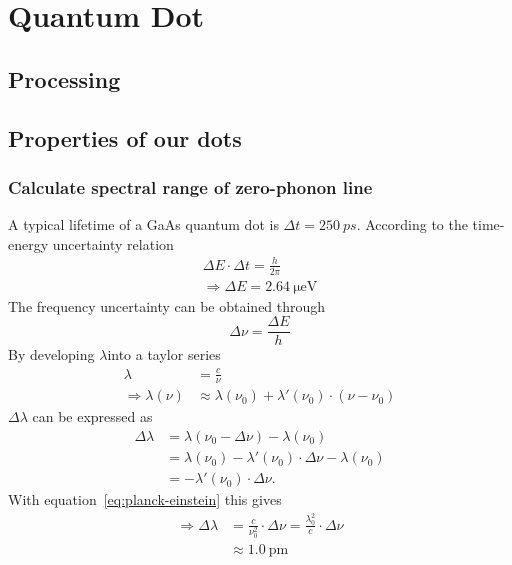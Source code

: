 \chapter{Quantum Dot}

\section{Processing}

\section{Properties of our dots}

\subsection{Calculate spectral range of zero-phonon line}
A typical lifetime of a GaAs quantum dot is $\Delta t = 250~ps$.
According to the time-energy uncertainty relation
\begin{align}
\Delta E \cdot \Delta t = \frac{h}{2 \pi}\\
\Rightarrow \Delta E = \SI{2.64}{\micro \electronvolt}
\end{align}
The frequency uncertainty can be obtained through
\begin{equation}
\Delta \nu = \frac{\Delta E}{h}
\end{equation}
By developing $\lambda$into a taylor series
\begin{align}
\label{eq:planck-einstein}
\lambda &= \frac{c}{\nu}\\
\Rightarrow \lambda(\nu) &\approx \lambda(\nu_0) + \lambda'(\nu_0) \cdot (\nu - \nu_0)
\end{align}
$\Delta \lambda$ can be expressed as
\begin{align}
\Delta \lambda &= \lambda(\nu_0 - \Delta \nu) - \lambda(\nu_0)\\
 &= \lambda(\nu_0) - \lambda'(\nu_0)\cdot\Delta \nu - \lambda(\nu_0)\\
 &= - \lambda'(\nu_0)\cdot \Delta \nu.
\end{align}
With equation~\eqref{eq:planck-einstein} this gives
\begin{align}
\Rightarrow \Delta \lambda &= \frac{c}{\nu_0^2} \cdot \Delta \nu = \frac{\lambda_0^2}{c}\cdot\Delta \nu\\
&\approx \SI{1.0}{\pico \metre}
\end{align}

